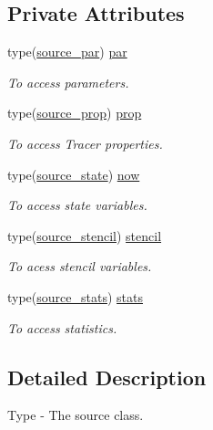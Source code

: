 \subsection*{Private Attributes}
\begin{DoxyCompactItemize}
\item 
type(\mbox{\hyperlink{structsources__mod_1_1source__par}{source\+\_\+par}}) \mbox{\hyperlink{structsources__mod_1_1source__class_a7dcca40df4b520fa207dbe93d7e49b2e}{par}}
\begin{DoxyCompactList}\small\item\em To access parameters. \end{DoxyCompactList}\item 
type(\mbox{\hyperlink{structsources__mod_1_1source__prop}{source\+\_\+prop}}) \mbox{\hyperlink{structsources__mod_1_1source__class_a5acc9ceca409e3c1ef2ed8112325a845}{prop}}
\begin{DoxyCompactList}\small\item\em To access Tracer properties. \end{DoxyCompactList}\item 
type(\mbox{\hyperlink{structsources__mod_1_1source__state}{source\+\_\+state}}) \mbox{\hyperlink{structsources__mod_1_1source__class_aa79ef3a745f7e6e934acdda367e8995c}{now}}
\begin{DoxyCompactList}\small\item\em To access state variables. \end{DoxyCompactList}\item 
type(\mbox{\hyperlink{structsources__mod_1_1source__stencil}{source\+\_\+stencil}}) \mbox{\hyperlink{structsources__mod_1_1source__class_a7950d4033c4b4be466479fc8a11dad1c}{stencil}}
\begin{DoxyCompactList}\small\item\em To acess stencil variables. \end{DoxyCompactList}\item 
type(\mbox{\hyperlink{structsources__mod_1_1source__stats}{source\+\_\+stats}}) \mbox{\hyperlink{structsources__mod_1_1source__class_a2ed110f187434e6b6345f21822993517}{stats}}
\begin{DoxyCompactList}\small\item\em To access statistics. \end{DoxyCompactList}\end{DoxyCompactItemize}


\subsection{Detailed Description}
Type -\/ The source class. 

